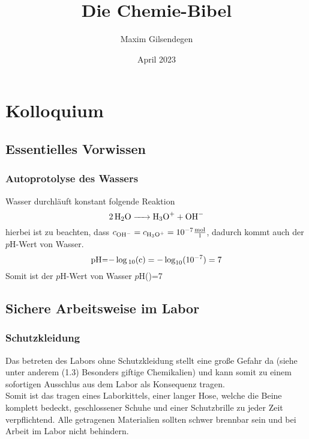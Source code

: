 \documentclass{article}
\begin{document}

\begin{titlepage}
    \author{Maxim Gilsendegen} 
    \title{\textbf{Die Chemie-Bibel}} 
    \date{April 2023}
    \maketitle
    \thispagestyle{empty}
    \end{titlepage}

\section{Kolloquium}


\subsection{Essentielles Vorwissen}
\subsubsection{Autoprotolyse des Wassers}
Wasser durchläuft konstant folgende Reaktion
\begin{equation}
    \ce{2H2O -> H3O+ + OH-}
\end{equation}
hierbei ist zu beachten, dass $c_{\ce{OH-}}=c_{\ce{H3O+}}=10^{-7}\frac{\mathrm{mol}}{\mathrm{l}}$, dadurch kommt auch der $p$H-Wert von Wasser.
\begin{equation}
    \ce{p\mathrm{H}=-\log_{10}(c)}=-\log_{10}(10^{-7})=7
\end{equation}
Somit ist der $p$H-Wert von Wasser $p$H()=7


\subsection{Sichere Arbeitsweise im Labor}


\subsubsection{Schutzkleidung}
Das betreten des Labors ohne Schutzkleidung stellt eine große Gefahr da (siehe unter anderem (1.3) Besonders giftige Chemikalien) und kann somit zu einem sofortigen Ausschlus aus dem Labor als Konsequenz tragen.\\
Somit ist das tragen eines Laborkittels, einer langer Hose, welche die Beine komplett bedeckt, geschlossener Schuhe und einer Schutzbrille zu jeder Zeit verpflichtend. Alle getragenen Materialien sollten schwer brennbar sein und bei Arbeit im Labor nicht behindern.\\
\end{document}
